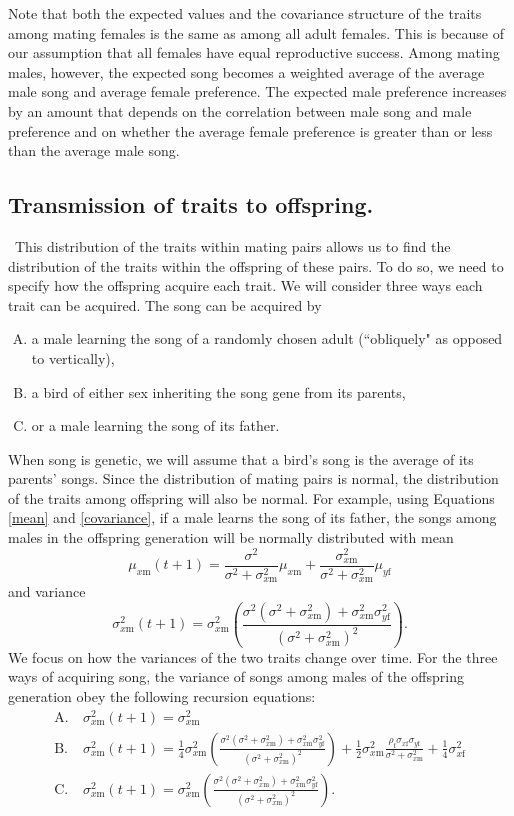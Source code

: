 \documentclass{article}
\newcommand{\x}[1]{\text{#1}}
\begin{document}
Note that both the expected values and the covariance structure of the traits among  mating females is the same as among all adult females. This is because of our assumption that all females have equal reproductive success. Among mating males, however, the expected song becomes a weighted average of the average male song and average female preference. The expected male preference increases by an amount that depends on the correlation between male song and male preference and on whether the average female preference is greater than or less than the average male song.

\subsection*{Transmission of traits to offspring.  } 
\ This distribution of the traits within mating pairs allows us to find the distribution of the traits within the offspring of these pairs. To do so, we need to specify how the offspring acquire each trait. We will consider three ways each trait can be acquired. The song can be acquired by 
\begin{enumerate}[A.]
\item a male learning the song of a randomly chosen adult (``obliquely" as opposed to vertically),
\item a bird of either sex inheriting the song gene from its parents, 
\item or a male learning the song of its father.
\end{enumerate}
When song is genetic, we will assume that a bird's song is the average of its parents' songs. Since the distribution of mating pairs is normal, the distribution of the traits among offspring will also be normal. For example, using Equations \ref{mean} and  \ref{covariance}, if a male learns the song of its father, the songs among males in the offspring generation will be normally distributed with mean $$\mu_{x\x{m}}(t+1)=\frac{\sigma^2}{\sigma^2+\sigma_{x\x{m}}^2}\mu_{x\x{m}}+\frac{\sigma_{x\x{m}}^2}{\sigma^2+\sigma_{x\x{m}}^2}\mu_{y\x{f}}$$ and variance $$\sigma_{x\x{m}}^2(t+1)=\sigma_{x\x{m}}^2\left(\frac{\sigma^2(\sigma^2+\sigma_{x\x{m}}^2)+\sigma_{ x\x{m}}^2\sigma_{y\x{f}}^2}{(\sigma^2+\sigma_{x\x{m}}^2)^2}\right).$$
We focus on how the variances of the two traits change over time. For the three ways of acquiring song, the variance of songs among males of the offspring generation obey the following recursion equations: 
\begin{align*}
\x{A.} \ &\sigma_{x\x{m}}^2(t+1)=\sigma_{x\x{m}}^2
\\ \x{B.} \ &\sigma_{x\x{m}}^2(t+1)=\frac{1}{4}\sigma_{x\x{m}}^2\left(\frac{\sigma^2(\sigma^2+\sigma_{x\x{m}}^2)+\sigma_{ x\x{m}}^2\sigma_{y\x{f}}^2}{(\sigma^2+\sigma_{x\x{m}}^2)^2}\right)+\frac{1}{2}\sigma_{x\x{m}}^2\frac{\rho_\x{f}\sigma_{x\x{f}}\sigma_{y\x{f}}}{\sigma^2+\sigma_{x\x{m}}^2}+\frac{1}{4}\sigma_{x\x{f}}^2
\\\x{C.} \ &\sigma_{x\x{m}}^2(t+1)=\sigma_{x\x{m}}^2\left(\frac{\sigma^2(\sigma^2+\sigma_{x\x{m}}^2)+\sigma_{ x\x{m}}^2\sigma_{y\x{f}}^2}{(\sigma^2+\sigma_{x\x{m}}^2)^2}\right).
\end{align*}
\end{document}
